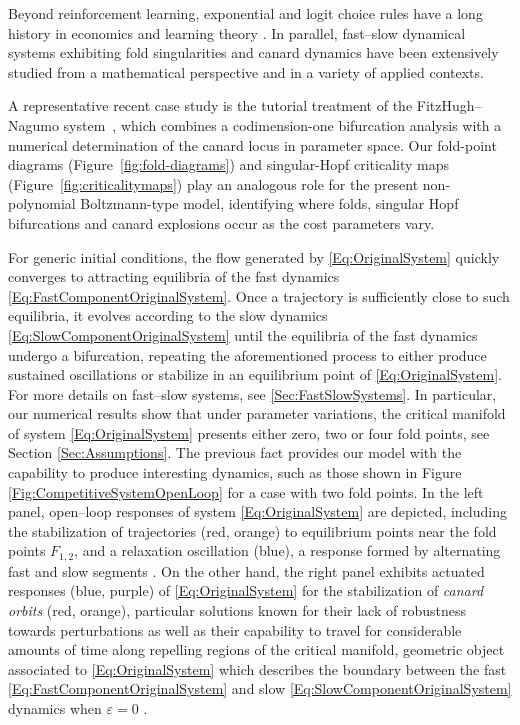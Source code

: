 \documentclass[3p]{elsarticle}
\theoremstyle{plain}
\theoremstyle{remark}
\theoremstyle{definition}
\begin{document}
Beyond reinforcement learning, exponential and logit choice rules have a
long history in economics and learning theory
\cite{mcfadden1972conditional,sutton1998reinforcement}. In parallel, fast--slow dynamical systems exhibiting fold singularities and canard dynamics have been extensively studied from a mathematical perspective \cite{Ref:Krupa2001,Ref:Kuehn2015} and in a variety of applied contexts. 

    A representative recent case study is the tutorial treatment of the
FitzHugh--Nagumo system~\cite{goncalves},
which combines a codimension-one bifurcation analysis with a numerical
determination of the canard locus in parameter space. Our fold-point diagrams
(Figure~\ref{fig:fold-diagrams}) and singular-Hopf criticality maps
(Figure~\ref{fig:criticalitymaps}) play an analogous role for the present
non-polynomial Boltzmann-type model, identifying where folds, singular Hopf
bifurcations and canard explosions occur as the cost parameters vary.
    
 
    For generic initial conditions, the flow generated by \eqref{Eq:OriginalSystem} quickly converges to attracting equilibria of the fast dynamics \eqref{Eq:FastComponentOriginalSystem}. Once a trajectory is sufficiently close to such equilibria, it evolves according to the slow dynamics \eqref{Eq:SlowComponentOriginalSystem} until the equilibria of the fast dynamics undergo a bifurcation, repeating the aforementioned process to either produce sustained oscillations or stabilize in an equilibrium point of \eqref{Eq:OriginalSystem}. For more details on fast--slow systems, see \ref{Sec:FastSlowSystems}. In particular, our numerical results show that under parameter variations, the critical manifold of system \eqref{Eq:OriginalSystem} presents either zero, two or four fold points, see Section \ref{Sec:Assumptions}. The previous fact provides our model with the capability to produce interesting dynamics, such as those shown in Figure \ref{Fig:CompetitiveSystemOpenLoop} for a case with two fold points. In the left panel, open--loop responses of system \eqref{Eq:OriginalSystem} are depicted, including the stabilization of trajectories (red, orange) to equilibrium points near the fold points $F_{1,2}$, and a relaxation oscillation (blue), a response formed by alternating fast and slow segments \cite{Ref:Grasman2011}. On the other hand, the right panel exhibits actuated responses (blue, purple) of \eqref{Eq:OriginalSystem} for the stabilization of \emph{canard orbits} (red, orange), particular solutions known for their lack of robustness towards perturbations as well as their capability to travel for considerable amounts of time along repelling regions of the critical manifold, geometric object associated to \eqref{Eq:OriginalSystem} which describes the boundary between the fast \eqref{Eq:FastComponentOriginalSystem} and slow \eqref{Eq:SlowComponentOriginalSystem} dynamics when $\varepsilon=0$ \cite{Ref:Szmolyan2001, Ref:Kuehn2015, Ref:JardonKojakhmetov2022}.
\end{document}
